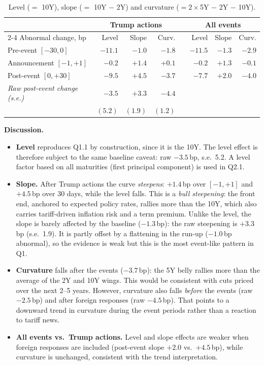 \documentclass[11pt]{article}
\begin{document}
\begin{table}[!htbp]
\centering
\small
\begin{tabular}{lrrrcrrr}
\toprule
 & \multicolumn{3}{c}{Trump actions} & & \multicolumn{3}{c}{All events} \\
\cmidrule{2-4}\cmidrule{6-8}
Abnormal change, bp & Level & Slope & Curv. & & Level & Slope & Curv. \\
\midrule
Pre-event $[-30,0]$    & $-11.1$ & $-1.0$ & $-1.8$ & & $-11.5$ & $-1.3$ & $-2.9$ \\
Announcement $[-1,+1]$ & $-0.2$  & $+1.4$ & $+0.1$ & & $-0.2$  & $+1.3$ & $-0.1$ \\
Post-event $[0,+30]$   & $-9.5$  & $+4.5$ & $-3.7$ & & $-7.7$  & $+2.0$ & $-4.0$ \\
\addlinespace
\emph{Raw post-event change (s.e.)} & $-3.5$ & $+3.3$ & $-4.4$ & & & & \\
 & $(5.2)$ & $(1.9)$ & $(1.2)$ & & & & \\
\bottomrule
\end{tabular}
\caption{Level ($=$ 10Y), slope ($=$ 10Y $-$ 2Y) and curvature
($=2\times$5Y $-$ 2Y $-$ 10Y).}
\label{tab:q12}
\end{table}

\textbf{Discussion.}
\begin{itemize}[leftmargin=1.2em,nosep]
\item \textbf{Level} reproduces Q1.1 by construction, since it is the 10Y.
The level effect is therefore subject to the same baseline caveat: raw
$-3.5$\,bp, s.e.\ 5.2. A level factor based on all maturities (first
principal component) is used in Q2.1.
\item \textbf{Slope.} After Trump actions the curve \emph{steepens}: $+1.4$\,bp
over $[-1,+1]$ and $+4.5$\,bp over 30 days, while the level falls. This is a
\emph{bull steepening}: the front end, anchored to expected policy rates,
rallies more than the 10Y, which also carries tariff-driven inflation risk and
a term premium. Unlike the level, the slope is barely affected by the
baseline ($-1.3$\,bp): the raw steepening is $+3.3$\,bp (s.e.\ 1.9). It is
partly offset by a flattening in the run-up ($-1.0$\,bp abnormal), so the
evidence is weak but this is the most event-like pattern in Q1.
\item \textbf{Curvature} falls after the events ($-3.7$\,bp): the 5Y belly
rallies more than the average of the 2Y and 10Y wings. This would be
consistent with cuts priced over the next 2--5 years. However, curvature
also falls \emph{before} the events (raw $-2.5$\,bp) and after foreign
responses (raw $-4.5$\,bp). That points to a downward trend in curvature
during the event periods rather than a reaction to tariff news.
\item \textbf{All events vs.\ Trump actions.} Level and slope effects are
weaker when foreign responses are included (post-event slope $+2.0$ vs.\
$+4.5$\,bp), while curvature is unchanged, consistent with the trend
interpretation.
\end{itemize}
\end{document}
